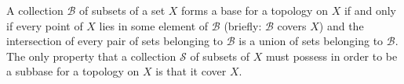 A collection $\mathcal{B}$ of subsets of a set $X$ forms a base for a topology on $X$ if and only if every point of $X$ lies in some element of $\mathcal{B}$ (briefly: $\mathcal{B}$ covers $X$) and the intersection of every pair of sets belonging to $\mathcal{B}$ is a union of sets belonging to $\mathcal{B}$. The only property that a collection $\mathcal{S}$ of subsets of $X$ must possess in order to be a subbase for a topology on $X$ is that it cover $X$.
